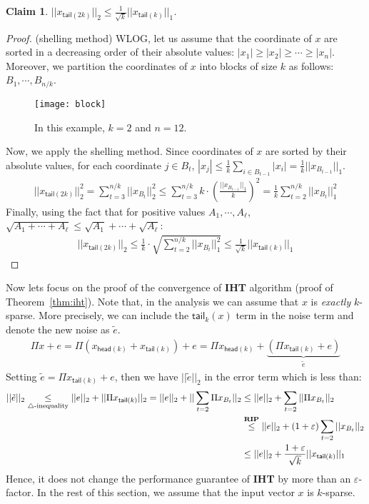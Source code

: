 \documentclass[11pt]{article}
\newcommand{\eps}{\varepsilon}
\newtheorem{claim}[theorem]{Claim}
\def\tail{\mathsf{tail}}
\def\head{\mathsf{head}}
\begin{document}
\begin{claim}\label{cl:l2-l1}
$||x_{\tail(2k)}||_2 \leq \frac{1}{\sqrt{k}} ||x_{\tail(k)}||_1$.
\end{claim}
\begin{proof}(shelling method)
WLOG, let us assume that the coordinate of $x$ are sorted in a decreasing order of their absolute values: $|x_1| \geq |x_2|\geq \cdots \geq |x_{n}|$. Moreover, we partition the coordinates of $x$ into blocks of size $k$ as follows: $B_1 ,\cdots, B_{n/k}$.
\begin{figure}[H]
\centering
\texttt{[image: block]}\label{fig:block}
\caption{In this example, $k=2$ and $n=12$.}
\end{figure}
Now, we apply the shelling method. Since coordinates of $x$ are sorted by their absolute values, for each coordinate $j \in B_t$, $|x_{j}| \leq \frac{1}{k}\sum_{i\in B_{t-1}} |x_i| = \frac{1}{k}||x_{B_{t-1}}||_1$. 
\begin{align*}
||x_{\tail(2k)}||_2^2 = \sum_{t=3}^{n/k} ||x_{B_t}||_2^2 \leq \sum_{t=3}^{n/k} k \cdot (\frac{||x_{B_{t-1}}||_1}{k})^2 =\frac{1}{k}\sum_{t=2}^{n/k} ||x_{B_t}||_1^2
\end{align*} 
Finally, using the fact that for positive values $A_1,\cdots, A_\ell$, $\sqrt{A_1+\cdots+A_{\ell}} \leq \sqrt{A_1} + \cdots + \sqrt{A_\ell}$:
\begin{align*}
||x_{\tail(2k)}||_2 \leq \frac{1}{k}\cdot \sqrt{\sum_{t=2}^{n/k} ||x_{B_{t}}||_1^2} \leq \frac{1}{\sqrt{k}}||x_{\tail(k)}||_1
\end{align*}
\end{proof}

Now lets focus on the proof of the convergence of {\bf IHT} algorithm (proof of Theorem~\ref{thm:iht}). Note that, in the analysis we can assume that $x$ is {\em exactly} $k$-sparse. More precisely, we can include the $\tail_{k}(x)$ term in the noise term and denote the new noise as $\tilde{e}$.
\begin{align}
\Pi x + e = \Pi(x_{\head(k)} + x_{\tail(k)}) + e = \Pi x_{\head(k)} + \underbrace{(\Pi x_{\tail(k)} + e)}_{\tilde{e}}
\end{align}
Setting $\tilde{e} = \Pi x_{\tail(k)} + e$, then we have $||\tilde{e}||_2$ in the error term which is less than:
\begin{align*}
||\tilde{e}||_2 \underset{\triangle\text{-inequality}}{\leq} ||e||_2 + ||\Pi x_{\tail(k)}||_2 = ||e||_2 + ||\sum_{t=2} \Pi x_{B_t}||_2 &\leq ||e||_2 + \sum_{t=2} ||\Pi x_{B_t}||_2\\ 
&\overset{{\bf RIP}}{\leq} ||e||_2 + (1+\varepsilon) \sum_{t=2} ||x_{B_t}||_2\\ 
&\leq ||e||_2 + \frac{1+\eps}{\sqrt{k}} ||x_{\tail(k)}||_1 
\end{align*}
Hence, it does not change the performance guarantee of {\bf IHT} by more than an $\varepsilon$-factor.  In the rest of this section, we assume that the input vector $x$ is $k$-sparse.
\end{document}

